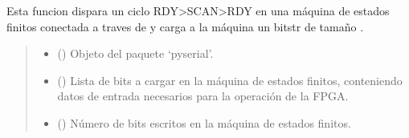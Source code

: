 \documentclass[letterpaper,10pt,english]{sphinxmanual}
\begin{document}
\begin{fulllineitems}
\label{\detokenize{fpga.interfaz_pcps:fpga.interfaz_pcps.scan}}
\pysigstartsignatures
{}
\pysigstopsignatures
\sphinxAtStartPar
Esta funcion dispara un ciclo RDY\sphinxhyphen{}\textgreater{}SCAN\sphinxhyphen{}\textgreater{}RDY en una máquina de estados finitos conectada a traves de  y carga a la máquina un bitstr de tamaño .
\begin{quote}\begin{description}
\begin{itemize}
\item {} 
\sphinxAtStartPar
{} () \textendash{} Objeto  del paquete ‘pyserial’.

\item {} 
\sphinxAtStartPar
{} (\sphinxstyleliteralemphasis{\sphinxupquote{,}}) \textendash{} Lista de bits a cargar en la máquina de estados finitos, conteniendo datos de entrada necesarios para la operación de la FPGA.

\item {} 
\sphinxAtStartPar
{} () \textendash{} Número de bits escritos en la máquina de estados finitos.

\end{itemize}

\end{description}\end{quote}

\end{fulllineitems}

\end{document}
